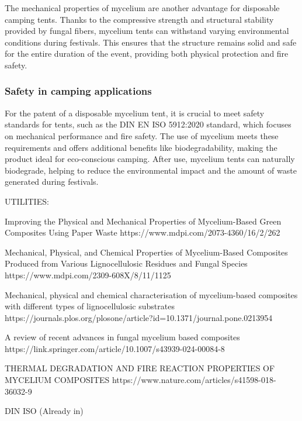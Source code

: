 The mechanical properties of mycelium are another advantage for disposable camping tents. Thanks to the
compressive strength and structural stability provided by fungal fibers, mycelium tents can withstand
varying environmental conditions during festivals. This ensures that the structure remains solid and safe
for the entire duration of the event, providing both physical protection and fire safety.


\subsubsection{Safety in camping applications}

For the patent of a disposable mycelium tent, it is crucial to meet safety standards for tents, such as
the DIN EN ISO 5912:2020 standard, which focuses on mechanical performance and fire safety. The use of
mycelium meets these requirements and offers additional benefits like biodegradability, making the product
ideal for eco-conscious camping. After use, mycelium tents can naturally biodegrade, helping to reduce the
environmental impact and the amount of waste generated during festivals.



UTILITIES:

Improving the Physical and Mechanical Properties of Mycelium-Based Green Composites Using Paper Waste
https://www.mdpi.com/2073-4360/16/2/262

Mechanical, Physical, and Chemical Properties of Mycelium-Based Composites Produced from Various Lignocellulosic Residues and Fungal Species
https://www.mdpi.com/2309-608X/8/11/1125

Mechanical, physical and chemical characterisation of mycelium-based composites with different types of lignocellulosic substrates
https://journals.plos.org/plosone/article?id=10.1371/journal.pone.0213954

A review of recent advances in fungal mycelium based composites
https://link.springer.com/article/10.1007/s43939-024-00084-8

THERMAL DEGRADATION AND FIRE REACTION PROPERTIES OF MYCELIUM COMPOSITES
https://www.nature.com/articles/s41598-018-36032-9

DIN ISO (Already in)